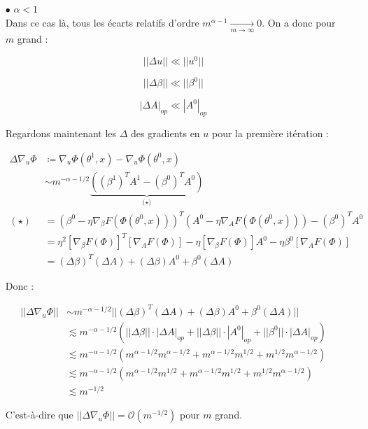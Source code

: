 \documentclass[a4paper, 11pt, french]{article}
\theoremstyle{definition}
\begin{document}
	\begin{itemize}
		\item[$\bullet$] $\alpha < 1$ \\
		
		Dans ce cas là, tous les écarts relatifs d'ordre $m^{\alpha - 1} \xrightarrow[m \to \infty]{} 0$. On a donc pour $m$ grand :
		
		\[||\Delta u|| \ll ||u^0||\]
		
		\[||\Delta \beta|| \ll ||\beta^0||\]
		
		\[|\Delta A|_{op} \ll |A^0|_{op}\]

		Regardons maintenant les $\Delta$ des gradients en $u$ pour la première itération :
		
		\begin{align}
			\Delta \nabla_u \Phi &\coloneqq \nabla_u \Phi (\theta^1, x) -  \nabla_u \Phi (\theta^0, x) \\
			&\sim m^{-\alpha - 1/2} \underbrace{((\beta^1)^T A^1 - (\beta^0)^T A^0)}_\text{($\star$)} \\
			 (\star) &= (\beta^0 - \eta \nabla_{\beta} F(\Phi(\theta^0, x)))^T (A^0 - \eta \nabla_{A} F(\Phi(\theta^0, x))) - (\beta^0)^T A^0 \\
			&= \eta^2 [\nabla_{\beta} F(\Phi)]^T[\nabla_{A} F(\Phi)] - \eta [\nabla_{\beta} F(\Phi)] A^0 - \eta \beta^0 [\nabla_{A} F(\Phi)] \\
			&= (\Delta \beta)^T(\Delta A) + (\Delta \beta) A^0 + \beta^0 (\Delta A)
		\end{align}
	
	Donc :
	
	\begin{align}
		||\Delta \nabla_u \Phi|| &\sim m^{-\alpha - 1/2} ||(\Delta \beta)^T(\Delta A) + (\Delta \beta) A^0 +  \beta^0 (\Delta A)|| \\
		&\lesssim m^{-\alpha - 1/2} (||\Delta \beta|| \cdot |\Delta A|_{op} + ||\Delta \beta|| \cdot |A^0|_{op} + ||\beta^0|| \cdot |\Delta A|_{op}) \\
		&\lesssim m^{-\alpha - 1/2} (m^{\alpha - 1/2}m^{\alpha - 1/2} + m^{\alpha - 1/2}m^{1/2} + m^{1/2}m^{\alpha - 1/2}) \\
		&\lesssim m^{-\alpha - 1/2} (m^{\alpha - 1/2}m^{1/2} + m^{\alpha - 1/2}m^{1/2} + m^{1/2}m^{\alpha - 1/2}) \\
		&\lesssim m^{-1/2}
	\end{align}

	C'est-à-dire que $||\Delta \nabla_u \Phi|| = \mathcal{O}(m^{-1/2})$ pour $m$ grand. \\
	

\end{itemize}
\end{document}
